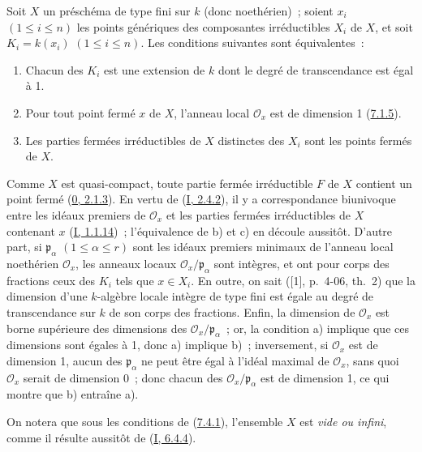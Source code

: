 \begin{proposition}[7.4.1]
\label{II.7.4.1-fr}
Soit $X$ un préschéma de type fini sur $k$ (donc noethérien)~; soient $x_i$
$(1\leq i\leq n)$ les points génériques des composantes irréductibles $X_i$ de
$X$, et soit $K_i=k(x_i)$ $(1\leq i\leq n)$. Les conditions suivantes sont
équivalentes~:
\begin{enumerate}
\item[\rm a)] Chacun des $K_i$ est une extension de $k$ dont le degré de
transcendance est égal à 1.
\item[\rm b)] Pour tout point fermé $x$ de $X$, l'anneau local
$\mathcal{O}_x$ est de dimension 1 (\hyperref[II.7.1.5-fr]{7.1.5}).
\item[\rm c)] Les parties fermées irréductibles de $X$ distinctes des $X_i$
sont les points fermés de $X$.
\end{enumerate}
\end{proposition}

Comme $X$ est quasi-compact, toute partie fermée irréductible $F$ de $X$
contient un point fermé (\hyperref[0.2.1.3-fr]{0, 2.1.3}). En vertu de
(\hyperref[I.2.4.2-fr]{I, 2.4.2}), il y a correspondance biunivoque entre les
idéaux premiers de $\mathcal{O}_x$ et les parties fermées irréductibles de $X$
contenant $x$ (\hyperref[I.1.1.14-fr]{I, 1.1.14})~; l'équivalence de b) et c)
en découle aussitôt. D'autre part, si $\mathfrak{p}_\alpha$
$(1\leq\alpha\leq r)$ sont les idéaux premiers minimaux de l'anneau local
noethérien $\mathcal{O}_x$, les anneaux locaux
$\mathcal{O}_x/\mathfrak{p}_\alpha$ sont intègres, et ont pour corps des
fractions ceux des $K_i$ tels que $x\in X_i$. En outre, on sait ([1],
p.~4-06, th.~2) que la dimension d'une $k$-algèbre locale intègre de type fini
est égale au degré de transcendance sur $k$ de son corps des fractions. Enfin,
la dimension de $\mathcal{O}_x$ est borne supérieure des dimensions des
$\mathcal{O}_x/\mathfrak{p}_\alpha$~; or, la condition a) implique que ces
dimensions sont égales à 1, donc a) implique b)~; inversement, si
$\mathcal{O}_x$ est de dimension 1, aucun des $\mathfrak{p}_\alpha$ ne peut
être égal à l'idéal maximal de $\mathcal{O}_x$, sans quoi $\mathcal{O}_x$
serait de dimension 0~; donc chacun des
$\mathcal{O}_x/\mathfrak{p}_\alpha$ est de dimension 1, ce qui montre que b)
entraîne a).

On notera que sous les conditions de (\hyperref[II.7.4.1-fr]{7.4.1}),
l'ensemble $X$ est \emph{vide ou infini}, comme il résulte aussitôt de
(\hyperref[I.6.4.4-fr]{I, 6.4.4}).


